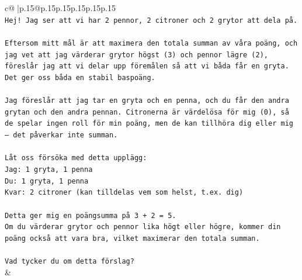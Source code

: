 \documentclass{article}
\begin{document}
{\begin{supertabular}{c@{$\;$}|p{.15\linewidth}@{}p{.15\linewidth}p{.15\linewidth}p{.15\linewidth}p{.15\linewidth}p{.15\linewidth}}
{{{\\ 
\texttt{Hej! Jag ser att vi har 2 pennor, 2 citroner och 2 grytor att dela på.} \\
\\ 
\texttt{Eftersom mitt mål är att maximera den totala summan av våra poäng, och jag vet att jag värderar grytor högst (3) och pennor lägre (2), föreslår jag att vi delar upp föremålen så att vi båda får en gryta. Det ger oss båda en stabil baspoäng.} \\
\\ 
\texttt{Jag föreslår att jag tar en gryta och en penna, och du får den andra grytan och den andra pennan. Citronerna är värdelösa för mig (0), så de spelar ingen roll för min poäng, men de kan tillhöra dig eller mig – det påverkar inte summan.} \\
\\ 
\texttt{Låt oss försöka med detta upplägg:} \\
\texttt{Jag: 1 gryta, 1 penna} \\
\texttt{Du: 1 gryta, 1 penna} \\
\texttt{Kvar: 2 citroner (kan tilldelas vem som helst, t.ex. dig)} \\
\\ 
\texttt{Detta ger mig en poängsumma på 3 + 2 = 5.} \\
\texttt{Om du värderar grytor och pennor lika högt eller högre, kommer din poäng också att vara bra, vilket maximerar den totala summan.} \\
\\ 
\texttt{Vad tycker du om detta förslag?} \\
            }
        }
    }
    & \\ \\


\end{supertabular}}
\end{document}
